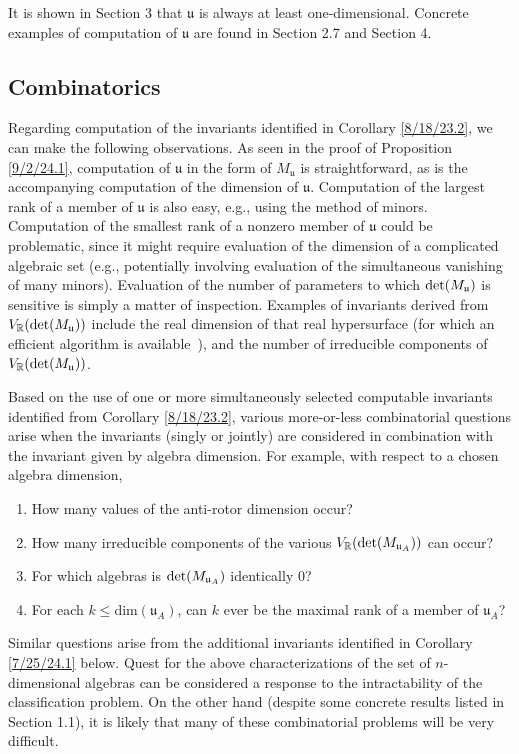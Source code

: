 \documentclass{amsart}
\numberwithin{equation}{section}
\theoremstyle{definition}
\numberwithin{theorem}{section}
\begin{document}
  
   It is shown in Section 3 that $\mathfrak{u}$ is always at least one-dimensional.   Concrete examples of computation of $\mathfrak{u}$ are found in Section 2.7 and Section 4.  
  
\subsection{Combinatorics} Regarding computation of the invariants identified in Corollary \ref{8/18/23.2}, we can make the following observations.  As seen in the proof of Proposition \ref{9/2/24.1}, computation of $\mathfrak{u}$ in the form of $M_\mathfrak{u}$ is straightforward, as is the accompanying computation of the dimension of $\mathfrak{u}$.   Computation of the largest rank of a member of $\mathfrak{u}$ is also easy, e.g., using the method of minors.  Computation of the smallest rank of a nonzero member of $\mathfrak{u}$ could be problematic, since it might require evaluation of the dimension of a complicated algebraic set (e.g., potentially involving evaluation of the simultaneous vanishing of many minors).  Evaluation of the number of parameters to which ${\rm det}(M_{\mathfrak{u}})$ is sensitive is simply a matter of inspection.  Examples of invariants derived from $V_\mathbb{R}({\rm det}(M_{\mathfrak{u}}))$ include the real dimension of that real hypersurface (for which an efficient algorithm is \mbox{available \cite{bannwarth:2015})}, and the number of irreducible components of $V_\mathbb{R}({\rm det}(M_{\mathfrak{u}}))$.  
 
Based on the use of one or more simultaneously selected computable invariants identified from Corollary \ref{8/18/23.2}, various more-or-less combinatorial questions arise when the invariants (singly or jointly) are considered in combination with the invariant given by algebra dimension.  For example, with respect to a chosen algebra dimension,  

\begin{enumerate} \item How many values of the anti-rotor dimension occur?  \item How many irreducible components of the various $V_\mathbb{R}({\rm det}(M_{\mathfrak{u}_A}))$ can occur?  \item For which algebras is ${\rm det}(M_{\mathfrak{u}_A})$ identically $0$?  \item For each $k\le \text{dim}(\mathfrak{u}_A)$, can $k$ ever be the maximal rank of a member of $\mathfrak{u}_A$?   \end{enumerate}  
Similar questions arise from the additional invariants identified in Corollary \ref{7/25/24.1} below.  Quest for the above characterizations of the set of $n$-dimensional algebras can be considered a response to the intractability of the classification problem.  On the other hand (despite some concrete results listed in Section 1.1), it is likely that many of these combinatorial problems will be very difficult.
\end{document}
